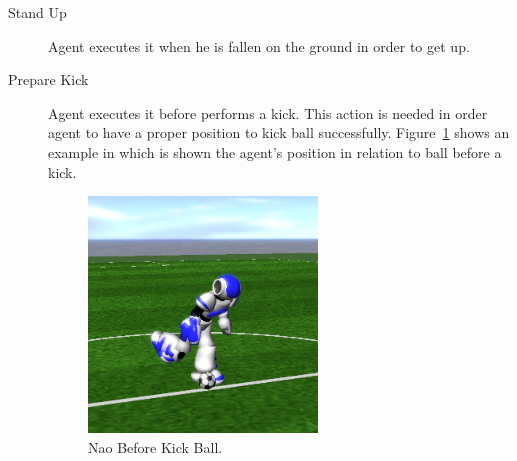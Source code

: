 \begin{description}
 \item[Stand Up] Agent executes it when he is fallen on the ground in order to get up.
 \item[Prepare Kick] Agent executes it before performs a kick. This action is needed in order agent to have a proper position to kick ball successfully. Figure~\ref{fig:NaoKick} shows an example in which is shown the agent's position in relation to ball before a kick.
  
  
\begin{figure}[t!]
  \centering
  \includegraphics[trim=0cm 3cm 0cm 4cm, clip,width=0.6\textwidth]{Chapter3/figures/NaoKick.png}
  \caption{Nao Before Kick Ball.}
  \label{fig:NaoKick}
\end{figure}
\end{description}



